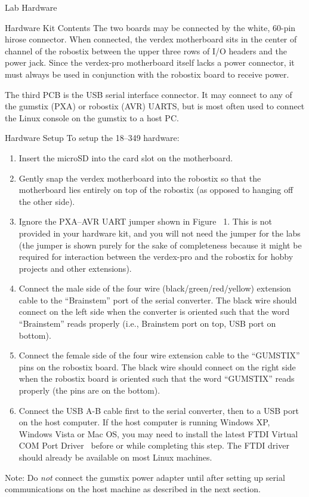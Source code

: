 \documentclass{article}
\begin{document}
\begin{section}{Lab Hardware}
\begin{subsection}{Hardware Kit Contents}
	The two boards may be connected by the white, 60-pin hirose
	connector.  When connected, the verdex motherboard sits
	in the center of channel of the robostix between the upper
	three rows of I/O headers and the power jack.  Since the
	verdex-pro motherboard itself lacks a power connector, it
	must always be used in conjunction with the robostix board to
	receive power.

	The third PCB is the USB serial interface connector.  It may
	connect to any of the gumstix (PXA) or robostix (AVR) UARTS,
	but is most often used to connect the Linux console on the
	gumstix to a host PC.  \end{subsection}

	\begin{subsection}{Hardware Setup} To setup the 18--349
	hardware: 
	\begin{enumerate} 
	\item Insert the microSD into the card slot on the motherboard.

	\item Gently snap the verdex motherboard into the
	robostix so that the motherboard lies entirely on top of the
	robostix (as opposed to hanging off the other side).

	\item Ignore the PXA--AVR UART jumper shown in Figure ~1. This is not provided in your hardware kit, and you will not need the jumper for the labs (the jumper is shown purely for the sake of completeness because it might be required for interaction between the verdex-pro and the robostix for hobby projects and other extensions).

	\item Connect the male side of the four wire
	(black/green/red/yellow) extension cable to the ``Brainstem''
	port of the serial converter.  The black wire should connect
	on the left side when the converter is oriented such that the
	word ``Brainstem'' reads properly (i.e., Brainstem port on
	top, USB port on bottom).

	\item Connect the female side of the four wire extension cable
	to the ``GUMSTIX'' pins on the robostix board.  The black wire
	should connect on the right side when the robostix board is
	oriented such that the word ``GUMSTIX'' reads properly (the
	pins are on the bottom).

	\item Connect the USB A-B cable first to the serial converter,
	then to a USB port on the host computer.  If the host computer
	is running Windows XP, Windows Vista or Mac OS, you may need
	to install the latest FTDI Virtual COM Port
	Driver~\cite{FTDI:VCP} before or while completing this step.
	The FTDI driver should already be available on most Linux
	machines.  \end{enumerate} %
	Note: Do \emph{not} connect the
	gumstix power adapter until after setting up serial
	communications on the host machine as described in the next
	section.  \end{subsection} \end{section}
\end{document}
